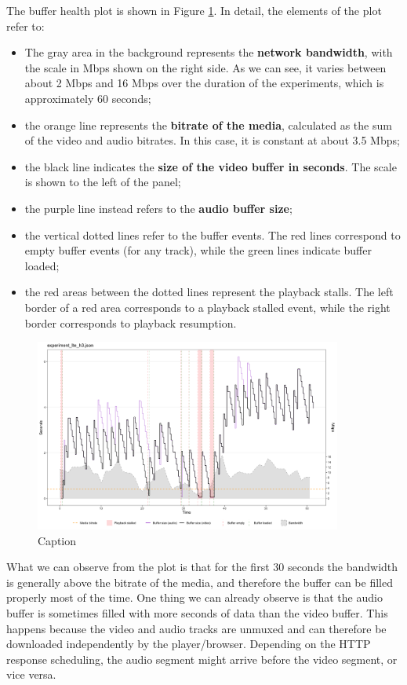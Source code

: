 The buffer health plot is shown in Figure \ref{fig:eval_nonabr_lte_h3}. In detail, the elements of the plot refer to:

\begin{itemize}
    \item The gray area in the background represents the \textbf{network bandwidth}, with the scale in Mbps shown on the right side. As we can see, it varies between about 2 Mbps and 16 Mbps over the duration of the experiments, which is approximately 60 seconds;
    \item the orange line represents the \textbf{bitrate of the media}, calculated as the sum of the video and audio bitrates. In this case, it is constant at about 3.5 Mbps;
    \item the black line indicates the \textbf{size of the video buffer in seconds}. The scale is shown to the left of the panel; 
    \item the purple line instead refers to the \textbf{audio buffer size};
    \item the vertical dotted lines refer to the buffer events. The red lines correspond to empty buffer events (for any track), while the green lines indicate buffer loaded;
    \item the red areas between the dotted lines represent the playback stalls. The left border of a red area corresponds to a playback stalled event, while the right border corresponds to playback resumption.
\end{itemize}

\begin{figure}[h]
    \centering
    \includegraphics[width=0.9\textwidth]{res/eval_nonabr_lte_h3.png}
    \caption{Caption}
    \label{fig:eval_nonabr_lte_h3}
\end{figure}

What we can observe from the plot is that for the first 30 seconds the bandwidth is generally above the bitrate of the media, and therefore the buffer can be filled properly most of the time. One thing we can already observe is that the audio buffer is sometimes filled with more seconds of data than the video buffer. This happens because the video and audio tracks are unmuxed and can therefore be downloaded independently by the player/browser. Depending on the HTTP response scheduling, the audio segment might arrive before the video segment, or vice versa.

